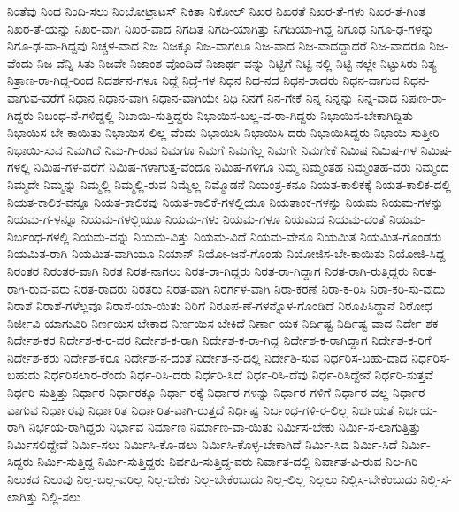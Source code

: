 {ನಿಂತೆವು
ನಿಂದ
ನಿಂದಿ-ಸಲು
ನಿಂಬೋಟ್ರಾಟಸ್
ನಿಕಿತಾ
ನಿಕೋಲ್
ನಿಖರ
ನಿಖರತೆ
ನಿಖರ-ತೆ-ಗಳು
ನಿಖರ-ತೆ-ಗಿಂತ
ನಿಖರ-ತೆ-ಯನ್ನು
ನಿಖರ-ವಾಗಿ
ನಿಖರ-ವಾದ
ನಿಗದಿತ
ನಿಗದಿ-ಯಾಗಿತ್ತು
ನಿಗದಿಯಾ-ಗಿದ್ದ
ನಿಗೂಢ
ನಿಗೂ-ಢ-ಗಳನ್ನು
ನಿಗೂ-ಢ-ವಾ-ಗಿದ್ದವು
ನಿಚ್ಚಳ-ವಾದ
ನಿಜ
ನಿಜಕ್ಕೂ
ನಿಜ-ವಾಗಲೂ
ನಿಜ-ವಾದ
ನಿಜ-ವಾದದ್ದಾದರೆ
ನಿಜ-ವಾದರೂ
ನಿಜ-ವೆಂದು
ನಿಜ-ವೆನ್ನಿ-ಸಿತು
ನಿಜವೇ
ನಿಜಾಂಶ-ವೊಂದಿದೆ
ನಿಜಾರ್ಥ-ವನ್ನು
ನಿಟ್ಟಿಗೆ
ನಿಟ್ಟಿ-ನಲ್ಲಿ
ನಿಟ್ಟಿ-ನಲ್ಲೇ
ನಿಟ್ಟುಸಿರು
ನಿತ್ಯ
ನಿತ್ರಾಣ-ರಾ-ಗಿದ್ದ-ರಿಂದ
ನಿದರ್ಶನ-ಗಳೂ
ನಿದ್ದೆ
ನಿದ್ರೆ-ಗಳ
ನಿಧನ
ನಿಧ-ನದ
ನಿಧನ-ರಾದರು
ನಿಧನ-ವಾಗುವ
ನಿಧನ-ವಾಗುವ-ವರೆಗೆ
ನಿಧಾನ
ನಿಧಾನ-ವಾಗಿ
ನಿಧಾನ-ವಾಗಿಯೇ
ನಿಧಿ
ನಿನಗೆ
ನಿನ-ಗೇಕೆ
ನಿನ್ನ
ನಿನ್ನನ್ನು
ನಿನ್ನ-ವಾದ
ನಿಪುಣ-ರಾ-ಗಿದ್ದರು
ನಿಬಂಧ-ನೆ-ಗಳಿದ್ದಲ್ಲಿ
ನಿಬಾಯಿ-ಸುತ್ತಿದ್ದರು
ನಿಭಾಯಿಸ-ಬಲ್ಲ-ವ-ರಾ-ಗಿದ್ದರು
ನಿಭಾಯಿಸ-ಬೇಕಾಗಿದ್ದಿತು
ನಿಭಾಯಿಸ-ಬೇ-ಕಾಯಿತು
ನಿಭಾಯಿಸ-ಲಿಲ್ಲ-ವೆಂದು
ನಿಭಾಯಿಸಿ
ನಿಭಾಯಿಸಿ-ದರು
ನಿಭಾಯಿಸಿದ್ದರು
ನಿಭಾಯಿ-ಸುತ್ತೀರಿ
ನಿಭಾಯಿ-ಸುವ
ನಿಮಗಿದೆ
ನಿಮ-ಗಿ-ರುವ
ನಿಮಗೂ
ನಿಮಗೆ
ನಿಮಗೆಲ್ಲ
ನಿಮಗೇ
ನಿಮಗೇಕೆ
ನಿಮಿಷ
ನಿಮಿಷ-ಗಳ
ನಿಮಿಷ-ಗಳಲ್ಲಿ
ನಿಮಿಷ-ಗಳ-ವರೆಗೆ
ನಿಮಿಷ-ಗಳಾಗುತ್ತ-ವೆಂದೂ
ನಿಮಿಷ-ಗಳಿಗೂ
ನಿಮ್ಮ
ನಿಮ್ಮಂತಹ
ನಿಮ್ಮಂತಹ-ವರು
ನಿಮ್ಮಂದ
ನಿಮ್ಮದೇ
ನಿಮ್ಮನ್ನು
ನಿಮ್ಮಲ್ಲಿ
ನಿಮ್ಮಲ್ಲಿ-ರುವ
ನಿಮ್ಮೆಲ್ಲ
ನಿಮ್ಮೊಡನೆ
ನಿಯಂತ್ರ-ಕನೂ
ನಿಯತ-ಕಾಲಿಕಕ್ಕೆ
ನಿಯತ-ಕಾಲಿಕ-ದಲ್ಲಿ
ನಿಯತ-ಕಾಲಿಕ-ವನ್ನೂ
ನಿಯತ-ಕಾಲಿಕವು
ನಿಯತ-ಕಾಲಿಕೆ-ಗಳಲ್ಲಿಯೂ
ನಿಯತಾಂಕ-ಗಳನ್ನು
ನಿಯಮ
ನಿಯಮ-ಗಳನ್ನು
ನಿಯಮ-ಗ-ಳನ್ನೂ
ನಿಯಮ-ಗಳಲ್ಲಿಯೂ
ನಿಯಮ-ಗಳು
ನಿಯಮ-ಗಳೂ
ನಿಯಮದ
ನಿಯಮ-ದಂತೆ
ನಿಯಮ-ನಿರ್ಬಂಧ-ಗಳಲ್ಲಿ
ನಿಯಮ-ವನ್ನು
ನಿಯಮ-ವಿತ್ತು
ನಿಯಮ-ವಿದೆ
ನಿಯಮ-ವೇನೂ
ನಿಯಮಿತ
ನಿಯಮಿತ-ಗೊಂಡರು
ನಿಯಮಿತ-ರಾಗಿ
ನಿಯಮಿತ-ವಾಗಿಯೂ
ನಿಯಾನ್
ನಿಯೋ-ಜನೆ-ಗೊಂಡು
ನಿಯೋಜಿಸ-ಬೇ-ಕಾಯಿತು
ನಿಯೋಜಿ-ಸಿದ್ದ
ನಿರಂತರ
ನಿರಂತರ-ವಾಗಿ
ನಿರತ
ನಿರತ-ನಾಗಲು
ನಿರತ-ರಾ-ಗಿದ್ದರು
ನಿರತ-ರಾ-ಗಿದ್ದಾಗ
ನಿರತ-ರಾಗಿ-ರುತ್ತಿದ್ದರು
ನಿರತ-ರಾಗಿ-ರುವ-ವರು
ನಿರತ-ರಾದರು
ನಿರತರು
ನಿರತ-ವಾಗಿ
ನಿರರ್ಗಳ-ವಾಗಿ
ನಿರಾ-ಕರಣೆ
ನಿರಾ-ಕ-ರಿಸಿ
ನಿರಾ-ಕರಿ-ಸು-ವುದು
ನಿರಾಶೆ
ನಿರಾಶೆ-ಗಳೆಲ್ಲವೂ
ನಿರಾಸೆ-ಯಾ-ಯಿತು
ನಿರಿಗೆ
ನಿರೂಪ-ಣೆ-ಗಳನ್ನೊಳ-ಗೊಂಡಿದೆ
ನಿರೂಪಿಸಿದ್ದಾನೆ
ನಿರೋಧ
ನಿರ್ಜೀವಿ-ಯಾಗುವಿರಿ
ನಿರ್ಣಯಿಸ-ಬೇಕಾದ
ನಿರ್ಣಯಿಸ-ಬೇಕಿದೆ
ನಿರ್ಣಾ-ಯಕ
ನಿರ್ದಿಷ್ಟ
ನಿರ್ದಿಷ್ಟ-ವಾದ
ನಿರ್ದೇ-ಶಕ
ನಿರ್ದೇಶ-ಕರ
ನಿರ್ದೇಶ-ಕ-ರ-ವರ
ನಿರ್ದೇಶ-ಕ-ರಾಗಿ
ನಿರ್ದೇಶ-ಕ-ರಾ-ಗಿದ್ದ
ನಿರ್ದೇಶ-ಕ-ರಾಗಿದ್ದಾಗ
ನಿರ್ದೇಶ-ಕ-ರಿಗೆ
ನಿರ್ದೇಶ-ಕರು
ನಿರ್ದೇಶ-ಕರೂ
ನಿರ್ದೇಶ-ನ-ದಂತೆ
ನಿರ್ದೇಶ-ನ-ದಲ್ಲಿ
ನಿರ್ದೇಶಿ-ಸುವ
ನಿರ್ಧರಿಸ-ಬಹು-ದಾದ
ನಿರ್ಧರಿಸ-ಬಹುದು
ನಿರ್ಧರಿಸಲಾರ-ರೆಂದು
ನಿರ್ಧ-ರಿಸಿ-ದರು
ನಿರ್ಧರಿ-ಸಿದೆ
ನಿರ್ಧ-ರಿಸಿ-ದೆವು
ನಿರ್ಧ-ರಿಸಿದ್ದೇನೆ
ನಿರ್ಧರಿ-ಸುತ್ತವೆ
ನಿರ್ಧರಿ-ಸುತ್ತಿತ್ತು
ನಿರ್ಧಾರ
ನಿರ್ಧಾರಕ್ಕೂ
ನಿರ್ಧಾ-ರಕ್ಕೆ
ನಿರ್ಧಾರ-ಗಳನ್ನು
ನಿರ್ಧಾರ-ಗಳಿಗೆ
ನಿರ್ಧಾರ-ವಲ್ಲ
ನಿರ್ಧಾರ-ವಾಗುವ
ನಿರ್ಧಾರವು
ನಿರ್ಧಾರಿತ
ನಿರ್ಧಾರಿತ-ವಾಗಿ-ರುತ್ತದೆ
ನಿರ್ಧಿಷ್ಟ
ನಿರ್ಬಂಧ-ಗಳಿ-ರ-ಲಿಲ್ಲ
ನಿರ್ಭಯತೆ
ನಿರ್ಭಯ-ರಾಗಿ
ನಿರ್ಭಯ-ರಾಗಿದ್ದರು
ನಿರ್ಭಾವ
ನಿರ್ಮಾಣ
ನಿರ್ಮಾಣ-ವಾ-ಯಿತು
ನಿರ್ಮಿಸ-ಬೇಕು
ನಿರ್ಮಿ-ಸ-ಲಾಗುತ್ತಿತ್ತು
ನಿರ್ಮಿಸಲಿದ್ದೇವೆ
ನಿರ್ಮಿ-ಸಲು
ನಿರ್ಮಿಸಿ-ಕೊ-ಡಲು
ನಿರ್ಮಿಸಿ-ಕೊಳ್ಳ-ಬೇಕಾಗಿದೆ
ನಿರ್ಮಿ-ಸಿದ
ನಿರ್ಮಿ-ಸಿದೆ
ನಿರ್ಮಿ-ಸಿದ್ದರು
ನಿರ್ಮಿ-ಸುತ್ತಿದ್ದ
ನಿರ್ಮಿ-ಸುತ್ತಿದ್ದರು
ನಿರ್ವಹಿ-ಸುತ್ತಿದ್ದ-ವರು
ನಿರ್ವಾತ-ದಲ್ಲಿ
ನಿರ್ವಾತ-ವಿ-ರುವ
ನಿಲ-ಗಿರಿ
ನಿಲುಕದ
ನಿಲುವು
ನಿಲ್ಲ-ಬಲ್ಲ-ವರಿಲ್ಲ
ನಿಲ್ಲ-ಬೇಕು
ನಿಲ್ಲ-ಬೇಕೆಂಬುದು
ನಿಲ್ಲ-ಲಿಲ್ಲ
ನಿಲ್ಲಲು
ನಿಲ್ಲಿಸ-ಬೇಕೆಂಬುದು
ನಿಲ್ಲಿ-ಸ-ಲಾಗಿತ್ತು
ನಿಲ್ಲಿ-ಸಲು
}
